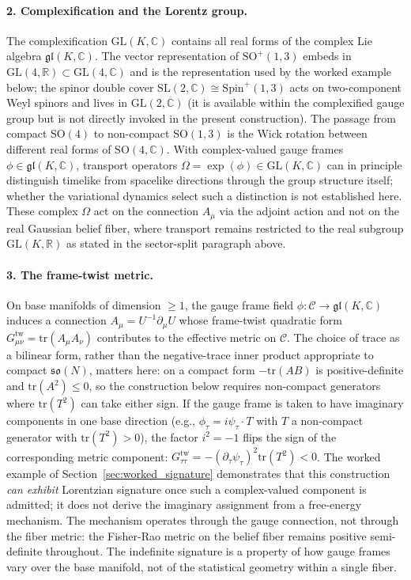\documentclass[11pt]{article}
\begin{document}
\paragraph{2. Complexification and the Lorentz group.} The complexification $\mathrm{GL}(K, \mathbb{C})$ contains all real forms of the complex Lie algebra $\mathfrak{gl}(K, \mathbb{C})$. The vector representation of $\mathrm{SO}^+(1,3)$ embeds in $\mathrm{GL}(4,\mathbb{R}) \subset \mathrm{GL}(4,\mathbb{C})$ and is the representation used by the worked example below; the spinor double cover $\mathrm{SL}(2,\mathbb{C}) \cong \mathrm{Spin}^+(1,3)$ acts on two-component Weyl spinors and lives in $\mathrm{GL}(2,\mathbb{C})$ (it is available within the complexified gauge group but is not directly invoked in the present construction). The passage from compact $\mathrm{SO}(4)$ to non-compact $\mathrm{SO}(1,3)$ is the Wick rotation between different real forms of $\mathrm{SO}(4, \mathbb{C})$. With complex-valued gauge frames $\phi \in \mathfrak{gl}(K, \mathbb{C})$, transport operators $\Omega = \exp(\phi) \in \mathrm{GL}(K, \mathbb{C})$ can in principle distinguish timelike from spacelike directions through the group structure itself; whether the variational dynamics select such a distinction is not established here. These complex $\Omega$ act on the connection $A_\mu$ via the adjoint action and not on the real Gaussian belief fiber, where transport remains restricted to the real subgroup $\mathrm{GL}(K, \mathbb{R})$ as stated in the sector-split paragraph above.

\paragraph{3. The frame-twist metric.} On base manifolds of dimension $\geq 1$, the gauge frame field $\phi: \mathcal{C} \to \mathfrak{gl}(K, \mathbb{C})$ induces a connection $A_\mu = U^{-1}\partial_\mu U$ whose frame-twist quadratic form $G_{\mu\nu}^{\mathrm{tw}} = \mathrm{tr}(A_\mu A_\nu)$ contributes to the effective metric on $\mathcal{C}$. The choice of trace as a bilinear form, rather than the negative-trace inner product appropriate to compact $\mathfrak{so}(N)$, matters here: on a compact form $-\mathrm{tr}(AB)$ is positive-definite and $\mathrm{tr}(A^2) \le 0$, so the construction below requires non-compact generators where $\mathrm{tr}(T^2)$ can take either sign. If the gauge frame is taken to have imaginary components in one base direction (e.g., $\phi_\tau = i\psi_\tau \cdot T$ with $T$ a non-compact generator with $\mathrm{tr}(T^2) > 0$), the factor $i^2 = -1$ flips the sign of the corresponding metric component: $G_{\tau\tau}^{\mathrm{tw}} = -(\partial_\tau \psi_\tau)^2 \mathrm{tr}(T^2) < 0$. The worked example of Section~\ref{sec:worked_signature} demonstrates that this construction \emph{can exhibit} Lorentzian signature once such a complex-valued component is admitted; it does not derive the imaginary assignment from a free-energy mechanism. The mechanism operates through the gauge connection, not through the fiber metric: the Fisher-Rao metric on the belief fiber remains positive semi-definite throughout. The indefinite signature is a property of how gauge frames vary over the base manifold, not of the statistical geometry within a single fiber.
\end{document}
